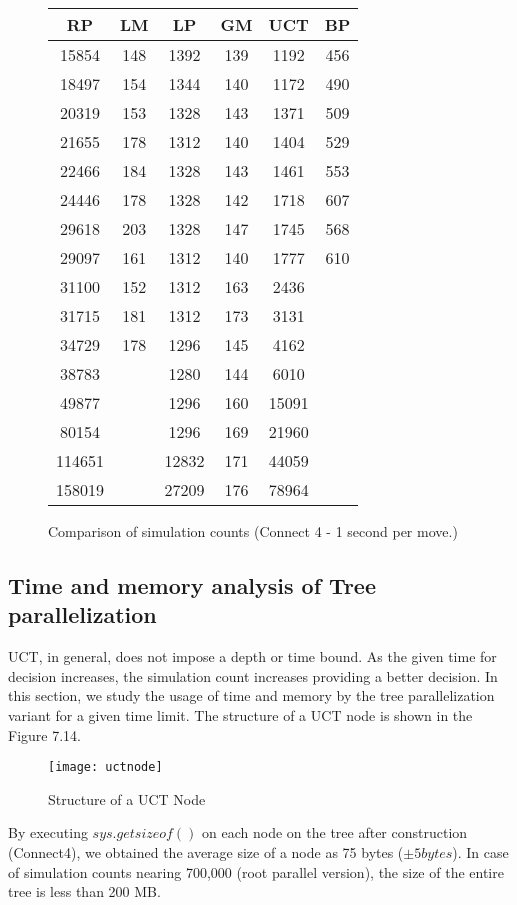 \documentclass[double,12pt]{beavtex}
\begin{document}
\begin{figure}[!ht]
\centering
\begin{tabular}{|c|c|c|c|c|c|} 
 \hline
  RP & LM & LP & GM & UCT & BP \\
 \hline
15854 &	148	& 1392 & 139 & 1192 & 456 \\
18497 & 154	& 1344 & 140 & 1172 & 490 \\
20319 & 153	& 1328 & 143 & 1371	& 509 \\
21655 & 178	& 1312 & 140 & 1404	& 529 \\
22466 & 184	& 1328 & 143 & 1461	& 553 \\
24446 & 178	& 1328 & 142 & 1718	& 607 \\
29618 & 203	& 1328 & 147 & 1745	& 568 \\
29097 & 161	& 1312 & 140 & 1777	& 610 \\
31100 & 152	& 1312 & 163 & 2436 & \\
31715 & 181	& 1312 & 173 & 3131 & \\
34729 & 178	& 1296 & 145 & 4162 & \\
38783 & &	1280 & 144 & 6010 & \\
49877 & &	1296 & 160 & 15091 & \\
80154 & &	1296 & 169 & 21960 & \\
114651 & &	12832 & 171 & 44059 & \\
158019 & &	27209 & 176 & 78964 & \\
\hline
\end{tabular}

\caption{Comparison of simulation counts (Connect 4 - 1 second per move.)}
\end{figure}

\subsection{Time and memory analysis of Tree parallelization}
UCT, in general, does not impose a depth or time bound. As the given time for decision increases, the simulation count increases providing a better decision. In this section, we study the usage of time and memory by the tree parallelization variant for a given time limit. The structure of a UCT node is shown in the Figure 7.14. 

\begin{figure}[h!]
\centering
\texttt{[image: uctnode]}
\caption{Structure of a UCT Node}
\end{figure}

By executing $sys.getsizeof()$ on each node on the tree after construction (Connect4), we obtained the average size of a node as 75 bytes ($\pm 5bytes$). In case of simulation counts nearing 700,000 (root parallel version), the size of the entire tree is less than 200 MB. 
\end{document}
